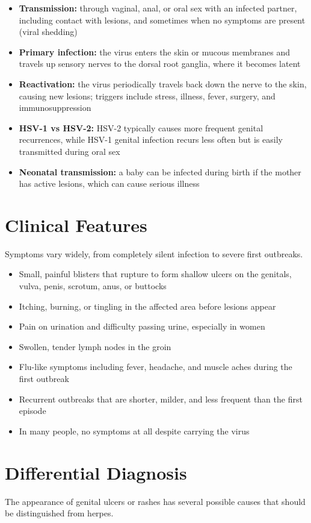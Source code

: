 \begin{itemize}
    \item \textbf{Transmission:} through vaginal, anal, or oral sex with an infected partner, including contact with lesions, and sometimes when no symptoms are present (viral shedding)
    \item \textbf{Primary infection:} the virus enters the skin or mucous membranes and travels up sensory nerves to the dorsal root ganglia, where it becomes latent
    \item \textbf{Reactivation:} the virus periodically travels back down the nerve to the skin, causing new lesions; triggers include stress, illness, fever, surgery, and immunosuppression
    \item \textbf{HSV-1 vs HSV-2:} HSV-2 typically causes more frequent genital recurrences, while HSV-1 genital infection recurs less often but is easily transmitted during oral sex
    \item \textbf{Neonatal transmission:} a baby can be infected during birth if the mother has active lesions, which can cause serious illness
\end{itemize}

\section*{Clinical Features}
Symptoms vary widely, from completely silent infection to severe first outbreaks.

\begin{itemize}
    \item Small, painful blisters that rupture to form shallow ulcers on the genitals, vulva, penis, scrotum, anus, or buttocks
    \item Itching, burning, or tingling in the affected area before lesions appear
    \item Pain on urination and difficulty passing urine, especially in women
    \item Swollen, tender lymph nodes in the groin
    \item Flu-like symptoms including fever, headache, and muscle aches during the first outbreak
    \item Recurrent outbreaks that are shorter, milder, and less frequent than the first episode
    \item In many people, no symptoms at all despite carrying the virus
\end{itemize}

\section*{Differential Diagnosis}
The appearance of genital ulcers or rashes has several possible causes that should be distinguished from herpes.

